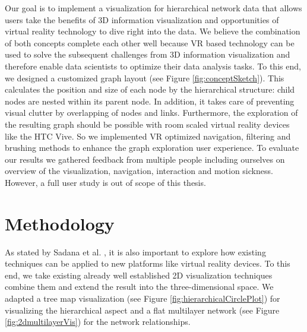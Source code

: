 Our goal is to implement a visualization for hierarchical network data that allows users take the benefits of 3D information visualization and opportunities of virtual reality technology to dive right into the data. We believe the combination of both concepts complete each other well because VR based technology can be used to solve the subsequent challenges from 3D information visualization and therefore enable data scientists to optimize their data analysis tasks. 
To this end, we designed a customized graph layout (see Figure \ref{fig:conceptSketch}).
This calculates the position and size of each node by the hierarchical structure: child nodes are nested within its parent node. In addition, it takes care of preventing visual clutter by overlapping of nodes and links. 
Furthermore, the exploration of the resulting graph should be possible with room scaled virtual reality devices like the HTC Vive. So we implemented VR optimized navigation, filtering and brushing methods to enhance the graph exploration user experience. 
To evaluate our results we gathered feedback from multiple people including ourselves on overview of the visualization, navigation, interaction and motion sickness. However, a full user study is out of scope of this thesis.

\section{Methodology}
As stated by Sadana et al. \cite{sadana_redefining_2016}, it is also important to explore how existing techniques can be applied to new platforms like virtual reality devices. To this end, we take existing already well established 2D visualization techniques combine them and extend the result into the three-dimensional space. We adapted a tree map visualization (see Figure \ref{fig:hierarchicalCirclePlot}) for visualizing the hierarchical aspect and a flat multilayer network (see Figure \ref{fig:2dmultilayerVis}) for the network relationships.  

